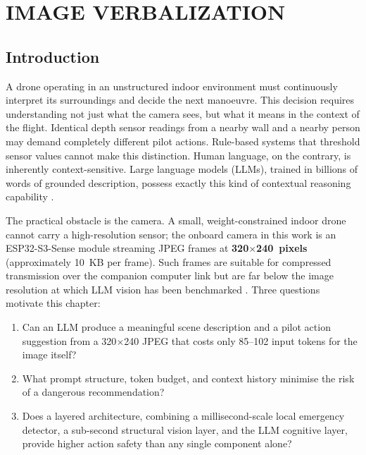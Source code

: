 \chapter{IMAGE VERBALIZATION}
\label{chap:2nd chap}

\section{Introduction}
\label{sec:ch2_intro}

A drone operating in an unstructured indoor environment must continuously interpret its surroundings and decide the next manoeuvre. 
This decision requires understanding not just what the camera
sees, but what it means in the context of the flight.
Identical depth sensor readings from a nearby wall and a nearby person may demand completely different pilot actions. 
Rule-based systems that threshold sensor values cannot make this distinction. 
Human language, on the contrary, is inherently context-sensitive. Large language models (LLMs), trained in billions of words of grounded description, possess exactly this kind of contextual reasoning capability \cite{vemprala2023chatgpt}.

The practical obstacle is the camera. A small, weight-constrained indoor drone cannot carry a high-resolution sensor; the onboard camera in this work is an ESP32-S3-Sense module streaming JPEG frames at \textbf{320$\times$240~pixels} (approximately 10~KB per frame). 
Such frames are suitable for compressed transmission over the companion computer link but are far below the image resolution at which LLM vision has been benchmarked \cite{achiam2023gpt4,
reid2024gemini, liu2023llava}.
\newpage
Three questions motivate this chapter:
\begin{enumerate}
  \item Can an LLM produce a meaningful scene description and a pilot
        action suggestion from a 320$\times$240 JPEG that costs only 85--102 input tokens for the image itself?
  \item What prompt structure, token budget, and context history minimise the risk of a dangerous recommendation?
  \item Does a layered architecture, combining a millisecond-scale local emergency detector, a sub-second structural vision layer, and the LLM cognitive layer, provide higher action safety than any single component alone?
\end{enumerate}


